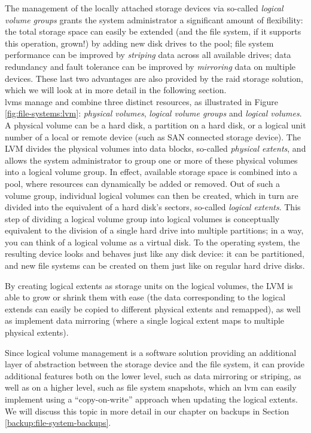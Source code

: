 The management of the locally attached storage devices
via so-called {\em logical volume groups} grants the
system administrator a significant amount of
flexibility: the total storage space can
easily be extended (and the file system, if it
supports this operation, grown!) by adding new disk
drives to the pool; file system performance can be
improved by {\em striping} data across all available
drives; data redundancy and fault tolerance can be
improved by {\em mirroring} data on multiple devices.
These last two advantages are also provided by the
\gls{raid} storage solution, which we will look at in more
detail in the following section. \\

\gls{lvm}s manage and combine three distinct
resources, as illustrated in Figure
\ref{fig:file-systems:lvm}: {\em physical volumes},
{\em logical volume groups} and {\em logical volumes}.
A physical volume can be a hard disk, a partition on a
hard disk, or a logical unit number of a local or
remote device (such as SAN connected storage device).
The LVM divides the physical volumes into data blocks,
so-called {\em physical extents}, and allows the system administrator to group
one or more of these physical volumes into a logical
volume group.  In effect, available storage space is
combined into a pool, where resources can dynamically
be added or removed.  Out of such a volume group,
individual logical volumes can then be created, which
in turn are divided into the equivalent of a hard
disk's sectors, so-called {\em logical
extents}.  This step of
dividing a logical volume group into logical volumes
is conceptually equivalent to the division of a single
hard drive into multiple partitions; in a way, you can
think of a logical volume as a virtual disk.  To the
operating system, the resulting device looks and
behaves just like any disk device: it can be
partitioned, and new file systems can be created on
them just like on regular hard drive disks.

By creating logical extents as storage units on the
logical volumes, the LVM is able to grow or shrink
them with ease (the data corresponding to the logical
extends can easily be copied to different physical
extents and remapped), as well as implement data
mirroring (where a single logical extent maps to
multiple physical extents).

Since logical volume management is a software solution
providing an additional layer of abstraction between
the storage device and the file system, it can provide
additional features both on the lower level, such as
data mirroring or striping, as well as on a higher
level, such as file system snapshots,
which an \gls{lvm} can easily implement using a
``copy-on-write'' approach when
updating the logical extents.  We will discuss this
topic in more detail in our chapter on backups in
Section \ref{backup:file-system-backups}.

